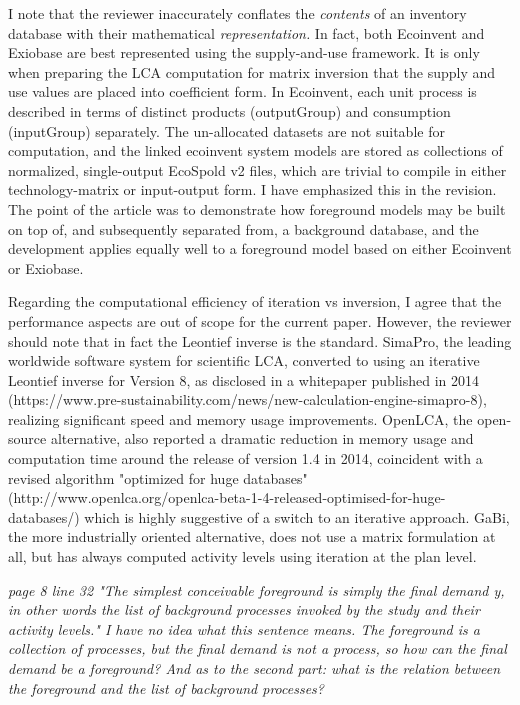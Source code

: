 \documentclass[11pt,letterpaper]{article}
\begin{document}
I note that the reviewer inaccurately conflates the \textit{contents} of an inventory database with their mathematical \textit{representation.}  In fact, both Ecoinvent and Exiobase are best represented using the supply-and-use framework.  It is only when preparing the LCA computation for matrix inversion that the supply and use values are placed into coefficient form.  In Ecoinvent, each unit process is described in terms of distinct products (outputGroup) and consumption (inputGroup) separately.  The un-allocated datasets are not suitable for computation, and the linked ecoinvent system models are stored as collections of normalized, single-output EcoSpold v2 files, which are trivial to compile in either technology-matrix or input-output form.  I have emphasized this in the revision.  The point of the article was to demonstrate how foreground models may be built on top of, and subsequently separated from, a background database, and the development applies equally well to a foreground model based on either Ecoinvent or Exiobase.  

Regarding the computational efficiency of iteration vs inversion, I agree that the performance aspects are out of scope for the current paper.  However, the reviewer should note that in fact the Leontief inverse is the standard.  SimaPro, the leading worldwide software system for scientific LCA, converted to using an iterative Leontief inverse for Version 8, as disclosed in a whitepaper published in 2014 (https://www.pre-sustainability.com/news/new-calculation-engine-simapro-8), realizing significant speed and memory usage improvements.  OpenLCA, the open-source alternative, also reported a dramatic reduction in memory usage and computation time around the release of version 1.4 in 2014, coincident with a revised algorithm "optimized for huge databases" (http://www.openlca.org/openlca-beta-1-4-released-optimised-for-huge-databases/) which is highly suggestive of a switch to an iterative approach.  GaBi, the more industrially oriented alternative, does not use a matrix formulation at all, but has always computed activity levels using iteration at the plan level.  

\emph{page 8 line 32 "The simplest conceivable foreground is simply the final demand y, in other words the list of background processes invoked by the study and their activity levels." I have no idea what this sentence means. The foreground is a collection of processes, but the final demand is not a process, so how can the final demand be a foreground? And as to the second part: what is the relation between the foreground and the list of background processes?}
\end{document}

